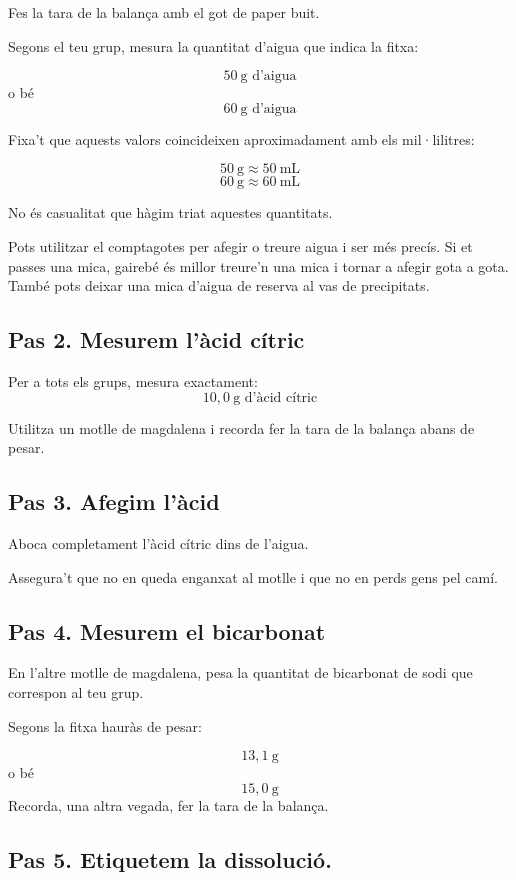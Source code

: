 Fes la tara de la balança amb el got de paper buit.

Segons el teu grup, mesura la quantitat d'aigua que indica la fitxa:

\[
50\ \text{g d'aigua}
\]
o bé
\[
60\ \text{g d'aigua}
\]

Fixa't que aquests valors coincideixen aproximadament amb els mil·lilitres:

\[
50\ \text{g} \approx 50\ \text{mL}
\]
\[
60\ \text{g} \approx 60\ \text{mL}
\]

No és casualitat que hàgim triat aquestes quantitats.

Pots utilitzar el comptagotes per afegir o treure aigua i ser més precís. Si et passes una mica, gairebé és millor treure'n una mica i tornar a afegir gota a gota. 
També pots deixar una mica d'aigua de reserva al vas de precipitats.



\vfill
\newpage

\subsection{Pas 2. Mesurem l'àcid cítric}

Per a tots els grups, mesura exactament:
\[
10,0\ \text{g d'àcid cítric}
\]

Utilitza un motlle de magdalena i recorda fer la tara de la balança abans de pesar.

\subsection{Pas 3. Afegim l'àcid}

Aboca completament l'àcid cítric dins de l'aigua.

Assegura't que no en queda enganxat al motlle i que no en perds gens pel camí.

\subsection{Pas 4. Mesurem el bicarbonat}

En l'altre motlle de magdalena, pesa la quantitat de bicarbonat de sodi que correspon al teu grup.

Segons la fitxa hauràs de pesar:

\[
13,1\ \text{g}
\]
o bé
\[
15,0\ \text{g}
\]
Recorda, una altra vegada, fer la tara de la balança.

\subsection{Pas 5. Etiquetem la dissolució.}

